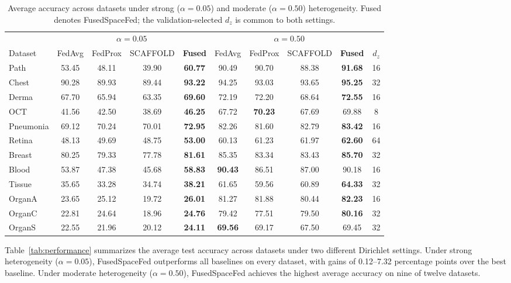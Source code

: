 \documentclass[twoside]{article}
\theoremstyle{thmstyleone}%
\theoremstyle{thmstyletwo}%
\theoremstyle{thmstylethree}%
\begin{document}
\begin{table}[t]
\centering
\caption{Average accuracy across datasets under strong ($\alpha=0.05$) and moderate ($\alpha=0.50$) heterogeneity. Fused denotes FusedSpaceFed; the validation-selected $d_z$ is common to both settings.}
\label{tab:performance}\label{tab:performance_1}
\small
\setlength{\tabcolsep}{4pt}
\begin{tabular}{@{}lccccccccc@{}}
\toprule
& \multicolumn{4}{c}{$\alpha=0.05$} & \multicolumn{4}{c}{$\alpha=0.50$} & \\
\cmidrule(lr){2-5}\cmidrule(lr){6-9}
Dataset & FedAvg & FedProx & SCAFFOLD & \textbf{Fused} & FedAvg & FedProx & SCAFFOLD & \textbf{Fused} & $d_z$ \\
\midrule
Path & 53.45 & 48.11 & 39.90 & \textbf{60.77} & 90.49 & 90.70 & 88.38 & \textbf{91.68} & 16 \\
Chest & 90.28 & 89.93 & 89.44 & \textbf{93.22} & 94.25 & 93.03 & 93.65 & \textbf{95.25} & 32 \\
Derma & 67.70 & 65.94 & 63.35 & \textbf{69.60} & 72.19 & 72.20 & 68.64 & \textbf{72.55} & 16 \\
OCT & 41.56 & 42.50 & 38.69 & \textbf{46.25} & 67.72 & \textbf{70.23} & 67.69 & 69.88 & 8 \\
Pneumonia & 69.12 & 70.24 & 70.01 & \textbf{72.95} & 82.26 & 81.60 & 82.79 & \textbf{83.42} & 16 \\
Retina & 48.13 & 49.69 & 48.75 & \textbf{53.00} & 60.13 & 61.23 & 61.97 & \textbf{62.60} & 64 \\
Breast & 80.25 & 79.33 & 77.78 & \textbf{81.61} & 85.35 & 83.34 & 83.43 & \textbf{85.70} & 32 \\
Blood & 53.87 & 47.38 & 45.68 & \textbf{58.83} & \textbf{90.43} & 86.51 & 87.00 & 90.18 & 16 \\
Tissue & 35.65 & 33.28 & 34.74 & \textbf{38.21} & 61.65 & 59.56 & 60.89 & \textbf{64.33} & 32 \\
OrganA & 23.65 & 25.12 & 19.72 & \textbf{26.01} & 81.27 & 81.88 & 80.44 & \textbf{82.23} & 16 \\
OrganC & 22.81 & 24.64 & 18.96 & \textbf{24.76} & 79.42 & 77.51 & 79.50 & \textbf{80.16} & 32 \\
OrganS & 22.55 & 21.96 & 20.12 & \textbf{24.11} & \textbf{69.56} & 69.17 & 67.50 & 69.45 & 32 \\
\bottomrule
\end{tabular}
\end{table}

Table~\ref{tab:performance} summarizes the average test accuracy across datasets under two different Dirichlet settings. Under strong heterogeneity ($\alpha=0.05$), FusedSpaceFed outperforms all baselines on every dataset, with gains of 0.12--7.32 percentage points over the best baseline. Under moderate heterogeneity ($\alpha=0.50$), FusedSpaceFed achieves the highest average accuracy on nine of twelve datasets. %
\end{document}
